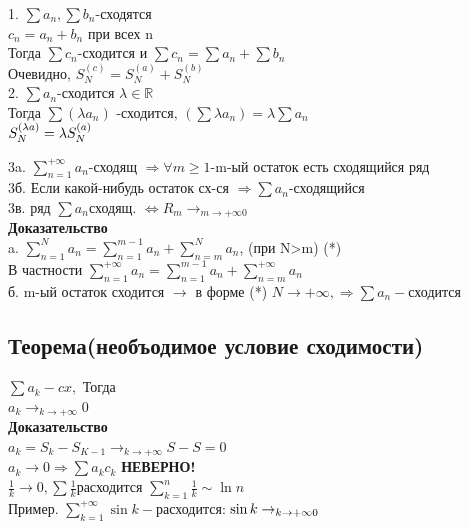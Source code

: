 \documentclass[12pt, a4paper]{article}
\begin{document}
	1. $ \sum a_n, \sum b_n $-сходятся\\
	$ c_n= a_n+b_n$ при всех n\\
	Тогда $\boxed{\sum c_n \text{-сходится и }  \sum c_n =\sum a_n +\sum b_n }$\\
	Очевидно, $ S_N^{(c)}=S_N^{(a)}+S_N^{(b)} $\\
	
	2. $ \sum a_n $-сходится $ \lambda \in \mathbb{R} $\\
	Тогда $\boxed{ \sum(\lambda a_n) \text{ -сходится, } (\sum\lambda a_n)=\lambda \sum a_n }$\\
	$ S_N^{(\lambda a)} = \lambda S_N^{(a)} \\$
	
	3a. $ \sum_{n=1}^{+\infty} a_n $-сходящ $ \Rightarrow \forall m \geq 1 $-m-ый остаток есть сходящийся ряд\\
	
	3б. Если какой-нибудь остаток сх-ся $\Rightarrow \sum a_n$-сходящийся\\
	
	3в. ряд $ \sum a_n $сходящ. $ \Leftrightarrow  R_m \rightarrow_{m \rightarrow +\infty 0}$\\
	\textbf{Доказательство}\\
	a. $ \sum_{n=1}^N a_n = \sum_{n=1}^{m-1} a_n +\sum_{n=m}^N a_n  $, (при N>m) (*) \\
	
	В частности $ \boxed{\sum_{n=1}^{+\infty} a_n =  \sum_{n=1}^{m-1} a_n +\sum_{n=m}^{+\infty} a_n } $\\
	б. m-ый остаток сходится  $  \rightarrow $ в  форме (*) $ N \rightarrow +\infty, \Rightarrow \sum a_n - $сходится\\
	
	
	\subsection{Теорема(необъодимое условие сходимости)}
	$ \sum a_k - cx, $ Тогда\\
	$\boxed{ a_k \rightarrow_{k \rightarrow + \infty} 0 }$\\
	\textbf{Доказательство}\\
	$ a_k = S_k - S_{K-1} \rightarrow_{k \rightarrow +\infty} S - S = 0 $\\
	
	$ a_k \rightarrow 0 \Rightarrow \sum a_k c_k$ \textbf{НЕВЕРНО!}   \\
	$ \frac{1}{k} \rightarrow 0 , \sum\frac{1}{k}   $расходится $ \boxed{\sum_{k=1}^{n} \frac{1}{k}\sim \ln n} $\\
	Пример. $ \sum_{k=1}^{+\infty} \sin k -  $расходится: $ \sin k \rightarrow_{k\rightarrow +\infty 0} \\$
\end{document}

